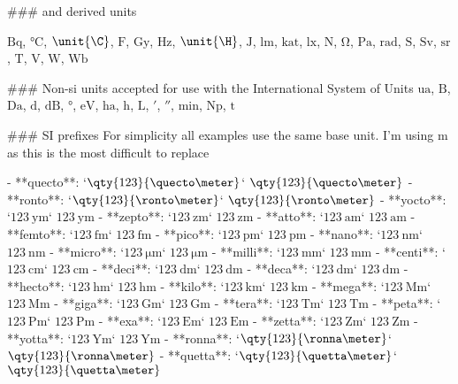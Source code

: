 \#\#\# and derived units

\(\unit{\becquerel}\), \(\unit{\degreeCelsius}\), \(\unit{\C}\),
\(\unit{\F}\), \(\unit{\gray}\), \(\unit{\Hz}\), \(\unit{\H}\),
\(\unit{\J}\), \(\unit{\lumen}\), \(\unit{\katal}\), \(\unit{\lux}\),
\(\unit{\N}\), \(\unit{ \ohm}\), \(\unit{\Pa}\), \(\unit{\radian}\),
\(\unit{\siemens}\), \(\unit{\sievert}\), \(\unit{\steradian}\),
\(\unit{\tesla}\), \(\unit{\V}\), \(\unit{\W}\), \(\unit{\weber}\)

\#\#\# Non-si units accepted for use with the International System of
Units \(\unit{\astronomicalunit}\), \(\unit{\bel}\), \(\unit{\dalton}\),
\(\unit{ \day}\), \(\unit{\dB}\), \(\unit{\degree}\), \(\unit{\eV}\),
\(\unit{\hectare}\), \(\unit{\hour}\), \(\unit{\L}\),
\(\unit{\arcminute}\), \(\unit{\arcsecond}\), \(\unit{\minute}\),
\(\unit{\neper}\), \(\unit{\tonne}\)

\#\#\# SI prefixes For simplicity all examples use the same base unit.
I'm using \(\unit{\meter}\) as this is the most difficult to replace

- **quecto**: `\(\qty{123}{\quecto\meter}\)`
\(\qty{123}{\quecto\meter}\) - **ronto**: `\(\qty{123}{\ronto\meter}\)`
\(\qty{123}{\ronto\meter}\) - **yocto**: `\(\qty{123}{\yocto\meter}\)`
\(\qty{123}{\yocto\meter}\) - **zepto**: `\(\qty{123}{\zepto\meter}\)`
\(\qty{123}{\zepto\meter}\) - **atto**: `\(\qty{123}{\atto\meter}\)`
\(\qty{123}{\atto\meter}\) - **femto**: `\(\qty{123}{\femto\meter}\)`
\(\qty{123}{\femto\meter}\) - **pico**: `\(\qty{123}{\pm}\)`
\(\qty{123}{\pm}\) - **nano**: `\(\qty{123}{\nm}\)` \(\qty{123}{\nm}\) -
**micro**: `\(\qty{123}{\micro \meter}\)` \(\qty{123}{\micro \meter}\) -
**milli**: `\(\qty{123}{\mm}\)` \(\qty{123}{\mm}\) - **centi**:
`\(\qty{123}{\cm}\)` \(\qty{123}{\cm}\) - **deci**: `\(\qty{123}{\dm}\)`
\(\qty{123}{\dm}\) - **deca**: `\(\qty{123}{\deca\meter}\)`
\(\qty{123}{\deca\meter}\) - **hecto**: `\(\qty{123}{\hecto\meter}\)`
\(\qty{123}{\hecto\meter}\) - **kilo**: `\(\qty{123}{\km}\)`
\(\qty{123}{\km}\) - **mega**: `\(\qty{123}{\mega\meter}\)`
\(\qty{123}{\mega\meter}\) - **giga**: `\(\qty{123}{\giga\meter}\)`
\(\qty{123}{\giga\meter}\) - **tera**: `\(\qty{123}{\tera\meter}\)`
\(\qty{123}{\tera\meter}\) - **peta**: `\(\qty{123}{\peta\meter}\)`
\(\qty{123}{\peta\meter}\) - **exa**: `\(\qty{123}{\exa\meter}\)`
\(\qty{123}{\exa\meter}\) - **zetta**: `\(\qty{123}{\zetta\meter}\)`
\(\qty{123}{\zetta\meter}\) - **yotta**: `\(\qty{123}{\yotta\meter}\)`
\(\qty{123}{\yotta\meter}\) - **ronna**: `\(\qty{123}{\ronna\meter}\)`
\(\qty{123}{\ronna\meter}\) - **quetta**: `\(\qty{123}{\quetta\meter}\)`
\(\qty{123}{\quetta\meter}\)

